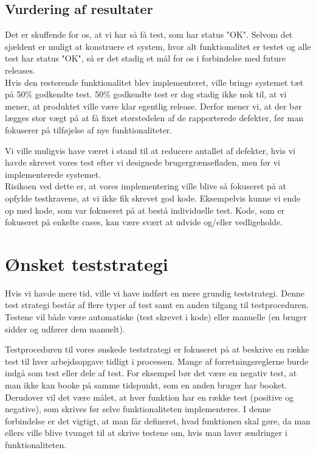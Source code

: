 \subsection*{Vurdering af resultater}
\label{Test_Results_eval}
Det er skuffende for os, at vi har så få test, som har status "OK". Selvom det sjældent er muligt at konstruere et system, hvor alt funktionalitet er testet og alle test har status "OK", så er det stadig et mål for os i forbindelse med future releases. 
\\Hvis den resterende funktionalitet blev implementeret, ville bringe systemet tæt på 50\% godkendte test. 50\% godkendte test er dog stadig ikke nok til, at vi mener, at produktet ville være klar egentlig release. Derfor mener vi, at der bør lægges stor vægt på at få fixet størstedelen af de rapporterede defekter, før man fokuserer på tilføjelse af nye funktionaliteter.

Vi ville muligvis have været i stand til at reducere antallet af defekter, hvis vi havde skrevet vores test efter vi designede brugergrænsefladen, men før vi implementerede systemet. 
\\Risikoen ved dette er, at vores implementering ville blive så fokuseret på at opfylde testkravene, at vi ikke fik skrevet god kode. Eksempelvis kunne vi ende op med kode, som var fokuseret på at bestå individuelle test. Kode, som er fokuseret på enkelte cases, kan være svært at udvide og/eller vedligeholde.

\section{Ønsket teststrategi}
\label{Test_intendedStrat}
Hvis vi havde mere tid, ville vi have indført en mere grundig teststrategi. Denne test strategi består af flere typer af test samt en anden tilgang til testproceduren. Testene vil både være automatiske (test skrevet i kode) eller manuelle (en bruger sidder og udfører dem manuelt).

Testproceduren til vores ønskede teststrategi er fokuseret på at beskrive en række test til hver arbejdsopgave tidligt i processen. Mange af forretningsreglerne burde indgå som test eller dele af test. For eksempel bør det være en negativ test, at man ikke kan booke på samme tidspunkt, som en anden bruger har booket.
\\Derudover vil det være målet, at hver funktion har en række test (positive og negative), som skrives før selve funktionaliteten implementeres. I denne forbindelse er det vigtigt, at man får defineret, hvad funktionen skal gøre, da man ellers ville blive tvunget til at skrive testene om, hvis man laver ændringer i funktionaliteten.


